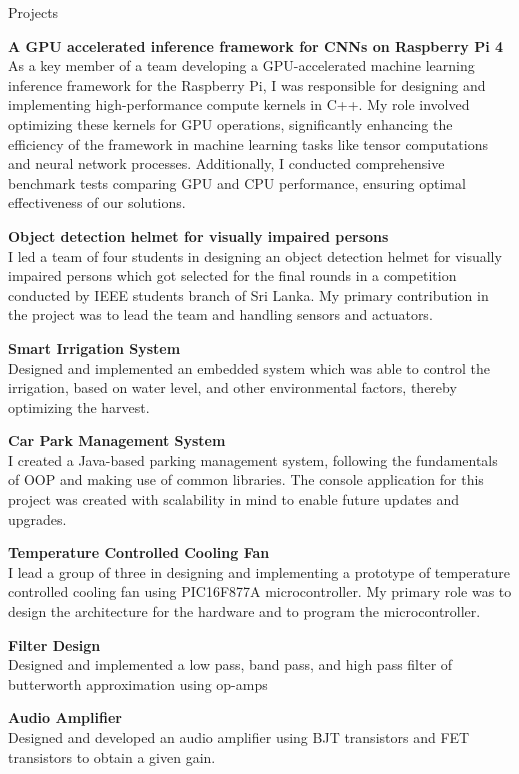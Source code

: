 \documentclass[
	11pt, %
]{./../assets/resume} %
\begin{document}

\begin{rSection}{Projects}

	\textbf{A GPU accelerated inference framework for CNNs on Raspberry Pi 4} \\
	As a key member of a team developing a GPU-accelerated machine learning inference framework for the Raspberry Pi, I was responsible for designing and implementing high-performance compute kernels in C++. My role involved optimizing these kernels for GPU operations, significantly enhancing the efficiency of the framework in machine learning tasks like tensor computations and neural network processes. Additionally, I conducted comprehensive benchmark tests comparing GPU and CPU performance, ensuring optimal effectiveness of our solutions.

	\textbf{Object detection helmet for visually impaired persons} \\
	I led a team of four students in designing an object detection helmet for visually impaired persons which got selected for the final rounds in a competition conducted by IEEE students branch of Sri Lanka. My primary contribution in the project was to lead the team and handling sensors and actuators.

	\textbf{Smart Irrigation System} \\
	Designed and implemented an embedded system which was able to control the irrigation, based on water level, and other environmental factors, thereby optimizing the harvest.

	\textbf{Car Park Management System} \\
	I created a Java-based parking management system, following the fundamentals of OOP and making use of common libraries. The console application for this project was created with scalability in mind to enable future updates and upgrades.

	\textbf{Temperature Controlled Cooling Fan} \\
	I lead a group of three in designing and implementing a prototype of temperature controlled cooling fan using PIC16F877A microcontroller. My primary role was to design the architecture for the hardware and to program the microcontroller.

	\textbf{Filter Design} \\
	Designed and implemented a low pass, band pass, and high pass filter of butterworth approximation using op-amps

	\textbf{Audio Amplifier} \\
	Designed and developed an audio amplifier using BJT transistors and FET transistors to obtain a given gain.

\end{rSection}
\end{document}
